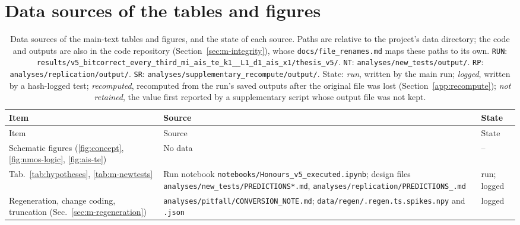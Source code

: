 \section{Data sources of the tables and figures}

\begin{longtable}{@{}L{0.25\textwidth}L{0.50\textwidth}L{0.19\textwidth}@{}}
\caption[Data sources of the tables and figures]{Data sources of the main-text tables and figures, and the state of each source. Paths are relative to the project's data directory; the code and outputs are also in the code repository (Section~\ref{sec:m-integrity}), whose \texttt{docs/\allowbreak file\_\allowbreak renames.md} maps these paths to its own. \texttt{RUN}: \texttt{results/\allowbreak v5\_\allowbreak bitcorrect\_\allowbreak every\_\allowbreak third\_\allowbreak mi\_\allowbreak ais\_\allowbreak te\_\allowbreak k1\_\_\allowbreak L1\_\allowbreak d1\_\allowbreak ais\_\allowbreak x1/\allowbreak thesis\_v5/}. \texttt{NT}: \texttt{analyses/\allowbreak new\_\allowbreak tests/\allowbreak output/\allowbreak }. \texttt{RP}: \texttt{analyses/\allowbreak replication/\allowbreak output/\allowbreak }. \texttt{SR}: \texttt{analyses/\allowbreak supplementary\_\allowbreak recompute/\allowbreak output/\allowbreak }. State: \emph{run}, written by the main run; \emph{logged}, written by a hash-logged test; \emph{recomputed}, recomputed from the run's saved outputs after the original file was lost (Section~\ref{app:recompute}); \emph{not retained}, the value first reported by a supplementary script whose output file was not kept.}
\label{tab:app-sources}\\
\toprule
Item & Source & State \\
\midrule
\endfirsthead
\toprule
Item & Source & State \\
\midrule
\endhead
Schematic figures (\ref{fig:concept}, \ref{fig:nmos-logic}, \ref{fig:ais-te}) & No data & -- \\
Tab.~\ref{tab:hypotheses}, \ref{tab:m-newtests} & Run notebook \texttt{notebooks/\allowbreak Honours\_\allowbreak v5\_\allowbreak executed.ipynb}; design files \texttt{analyses/\allowbreak new\_\allowbreak tests/\allowbreak PREDICTIONS*.md}, \texttt{analyses/\allowbreak replication/\allowbreak PREDICTIONS\_\allowbreak *.md} & run; logged \\
Regeneration, change coding, truncation (Sec.~\ref{sec:m-regeneration}) & \texttt{analyses/\allowbreak pitfall/\allowbreak CONVERSION\_\allowbreak NOTE.md}; \texttt{data/\allowbreak regen/\allowbreak *.regen.ts.spikes.npy} and \texttt{.json} & logged \\

\end{longtable}

